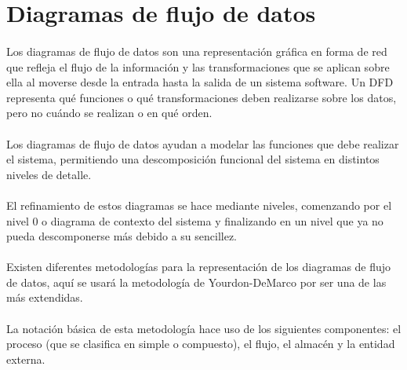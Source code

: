 \section{Diagramas de flujo de datos}

  \paragraph{}Los diagramas de flujo de datos son una representación gráfica en
  forma de red que refleja el flujo de la información y las transformaciones que
  se aplican sobre ella al moverse desde la entrada hasta la salida de un
  sistema software. Un DFD representa qué funciones o qué transformaciones deben
  realizarse sobre los datos, pero no cuándo se realizan o en qué orden.

  \paragraph{}Los diagramas de flujo de datos ayudan a modelar las funciones que
  debe realizar el sistema, permitiendo una descomposición funcional del sistema
  en distintos niveles de detalle.

  \paragraph{}El refinamiento de estos diagramas se hace mediante niveles,
  comenzando por el nivel 0 o diagrama de contexto del sistema y finalizando en
  un nivel que ya no pueda descomponerse más debido a su sencillez.

  \paragraph{}Existen diferentes metodologías para la representación de los
  diagramas de flujo de datos, aquí se usará la metodología de Yourdon-DeMarco
  por ser una de las más extendidas.

  \paragraph{}La notación básica de esta metodología hace uso de los siguientes
  componentes: el proceso (que se clasifica en simple o compuesto), el flujo, el
  almacén y la entidad externa.

